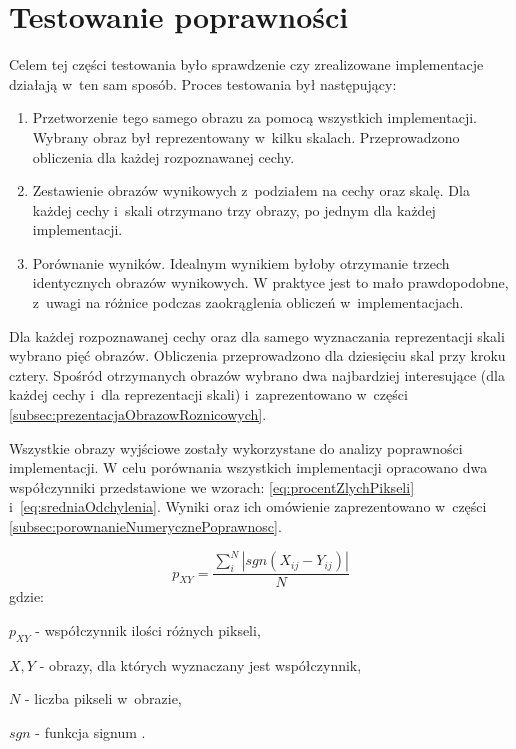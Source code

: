 \section{Testowanie poprawności}
\label{sec:testPoprawnosc}

Celem tej części testowania było sprawdzenie czy zrealizowane implementacje działają w~ten sam sposób. Proces testowania był następujący:

\begin{enumerate}
\item Przetworzenie tego samego obrazu za pomocą wszystkich implementacji. Wybrany obraz był reprezentowany w~kilku skalach. Przeprowadzono obliczenia dla każdej rozpoznawanej cechy.
\item Zestawienie obrazów wynikowych z~podziałem na cechy oraz skalę. Dla każdej cechy i~skali otrzymano trzy obrazy, po jednym dla każdej implementacji.
\item Porównanie wyników. Idealnym wynikiem byłoby otrzymanie trzech identycznych obrazów wynikowych. W praktyce jest to mało prawdopodobne, z~uwagi na różnice podczas zaokrąglenia obliczeń w~implementacjach.
\end{enumerate}

Dla każdej rozpoznawanej cechy oraz dla samego wyznaczania reprezentacji skali wybrano pięć obrazów. Obliczenia przeprowadzono dla dziesięciu skal przy kroku cztery. Spośród otrzymanych obrazów wybrano dwa najbardziej interesujące (dla każdej cechy i~dla reprezentacji skali) i~zaprezentowano w~części \ref{subsec:prezentacjaObrazowRoznicowych}.

Wszystkie obrazy wyjściowe zostały wykorzystane do analizy poprawności implementacji. W celu porównania wszystkich implementacji opracowano dwa współczynniki przedstawione we wzorach: \eqref{eq:procentZlychPikseli} i~\eqref{eq:sredniaOdchylenia}. Wyniki oraz ich omówienie zaprezentowano w~części \ref{subsec:porownanieNumerycznePoprawnosc}.

\begin{equation}
\label{eq:procentZlychPikseli}
p_{XY} = \frac{\sum_{i}^{N}|sgn(X_{ij}-Y_{ij})	|}{N}
\end{equation}
gdzie:

$ p_{XY} $ - współczynnik ilości różnych pikseli,

$ X, Y $ - obrazy, dla których wyznaczany jest współczynnik,

$ N $ - liczba pikseli w~obrazie,

$ sgn $ - funkcja signum \cite{Signum}.

